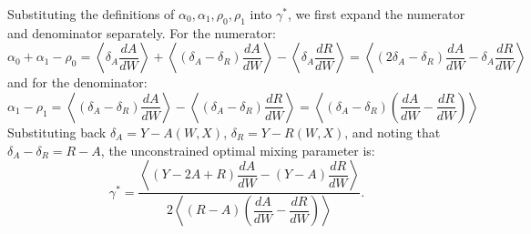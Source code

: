 \documentclass[12pt]{article}
\begin{document}
Substituting the definitions of $\alpha_0, \alpha_1, \rho_0, \rho_1$ into $\gamma^*$,
we first expand the numerator and denominator separately. For the numerator:
\begin{equation}
    \alpha_0 + \alpha_1 - \rho_0 
    = \left\langle \delta_A \frac{dA}{dW}\right\rangle 
    + \left\langle (\delta_A - \delta_R)\frac{dA}{dW}\right\rangle 
    - \left\langle \delta_A \frac{dR}{dW}\right\rangle
    = \left\langle (2\delta_A - \delta_R)\frac{dA}{dW} - \delta_A\frac{dR}{dW}\right\rangle
\end{equation}
and for the denominator:
\begin{equation}
    \alpha_1 - \rho_1 
    = \left\langle (\delta_A - \delta_R)\frac{dA}{dW}\right\rangle 
    - \left\langle (\delta_A - \delta_R)\frac{dR}{dW}\right\rangle 
    = \left\langle (\delta_A - \delta_R)\left(\frac{dA}{dW} - \frac{dR}{dW}\right)\right\rangle
\end{equation}
Substituting back $\delta_A = Y - A(W,X)$, $\delta_R = Y - R(W,X)$, and noting
that $\delta_A - \delta_R = R - A$, the unconstrained optimal mixing parameter is:
\begin{equation}
    \gamma^* = \frac{\left\langle (Y - 2A + R)\dfrac{dA}{dW} 
    - (Y-A)\dfrac{dR}{dW}\right\rangle}
    {2\left\langle (R-A)\left(\dfrac{dA}{dW} - \dfrac{dR}{dW}\right)\right\rangle}.
\end{equation}
\end{document}
